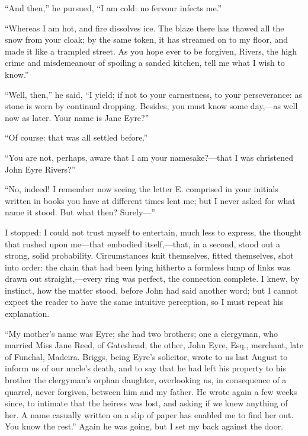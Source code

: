 \enquote{And then,} he pursued, \enquote{I am cold: no fervour infects
	me.}

\enquote{Whereas I am hot, and fire dissolves ice. The blaze there has
	thawed all the snow from your cloak; by the same token, it has streamed
	on to my floor, and made it like a trampled street. As you hope ever to
	be forgiven, \Mr{} Rivers, the high crime and misdemeanour of spoiling a
	sanded kitchen, tell me what I wish to know.}

\enquote{Well, then,} he said, \enquote{I yield; if not to your
	earnestness, to your perseverance: as stone is worn by continual
	dropping. Besides, you must know some day,---as well now as later.
	Your name is Jane Eyre?}

\enquote{Of course: that was all settled before.}

\enquote{You are not, perhaps, aware that I am your namesake?---that I
	was christened \St{} John Eyre Rivers?}

\enquote{No, indeed! I remember now seeing the letter E. comprised in
	your initials written in books you have at different times lent me; but
	I never asked for what name it stood. But what then? Surely---}

I stopped: I could not trust myself to entertain, much less to express,
the thought that rushed upon me---that embodied itself,---that, in a
second, stood out a strong, solid probability. Circumstances knit
themselves, fitted themselves, shot into order: the chain that had been
lying hitherto a formless lump of links was drawn out straight,---every
ring was perfect, the connection complete. I knew, by instinct, how the
matter stood, before \St{} John had said another word; but I cannot expect
the reader to have the same intuitive perception, so I must repeat his
explanation.

\enquote{My mother's name was Eyre; she had two brothers; one a
	clergyman, who married Miss Jane Reed, of Gateshead; the other, John
	Eyre, Esq., merchant, late of Funchal, Madeira. \Mr{} Briggs, being \Mr{}
	Eyre's solicitor, wrote to us last August to inform us of our uncle's
	death, and to say that he had left his property to his brother the
	clergyman's orphan daughter, overlooking us, in consequence of a
	quarrel, never forgiven, between him and my father. He wrote again a
	few weeks since, to intimate that the heiress was lost, and asking if we
	knew anything of her. A name casually written on a slip of paper has
	enabled me to find her out. You know the rest.} Again he was going,
but I set my back against the door.

